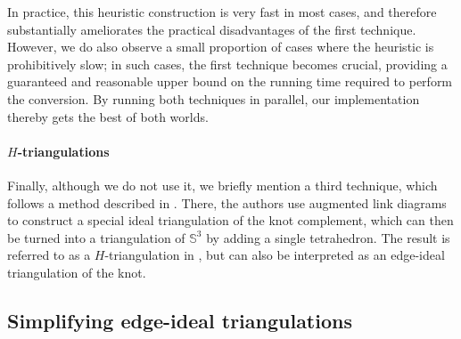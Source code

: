 \documentclass[a4paper,UKenglish,cleveref, autoref, thm-restate]{lipics-v2021}
\begin{document}
In practice, this heuristic construction is very fast in most cases, and therefore substantially ameliorates the practical disadvantages of the first technique.
However, we do also observe a small proportion of cases where the heuristic is prohibitively slow;
in such cases, the first technique becomes crucial, providing a guaranteed and reasonable upper bound on the running time required to perform the conversion.
By running both techniques in parallel, our implementation thereby gets the best of both worlds.

\paragraph*{$H$-triangulations}

Finally, although we do not use it, we briefly mention a third technique, which follows a method described in  \cite{ibarra2024Htriangulation}.
There, the authors use augmented link diagrams to construct a special ideal triangulation of the knot complement,
which can then be turned into a triangulation of $\mathbb{S}^3$ by adding a single tetrahedron.
The result is referred to as a $H$-triangulation in \cite{aribi2023Htriangulation,ibarra2024Htriangulation},
but can also be interpreted as an edge-ideal triangulation of the knot.

\subsection{Simplifying edge-ideal triangulations}\label{app:ssec:simplifyEdgeIdeal}
\end{document}
